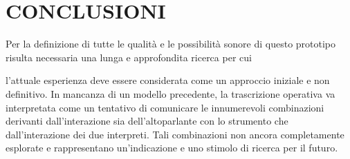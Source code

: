 
\chapter{CONCLUSIONI}
\label{chp:ricerca}

Per la definizione di tutte le qualità e le possibilità sonore di questo prototipo risulta necessaria una lunga e approfondita ricerca per cui

l’attuale esperienza deve essere considerata come un approccio iniziale e non definitivo.
In mancanza di un modello precedente, la trascrizione operativa va interpretata come un tentativo di comunicare le innumerevoli combinazioni derivanti dall’interazione sia dell’altoparlante con lo strumento che dall’interazione dei due interpreti.
Tali combinazioni non ancora completamente esplorate e rappresentano un’indicazione e uno stimolo di ricerca per il futuro.
